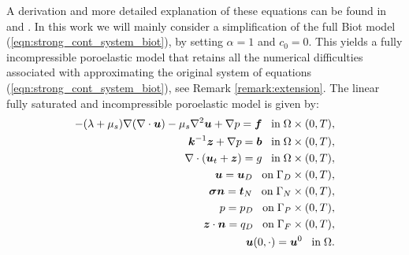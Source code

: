 \begin{table}[H]
\begin{center}
\end{center}
\caption{Poroelasticity parameters.} 
\label{tab:parameters}
\end{table}
\noindent A derivation and more detailed explanation of these equations can be found in \citet{phillips2007coupling} and \citet{showalter2000diffusion}. In this work we will mainly consider a simplification of the full Biot model (\ref{eqn:strong_cont_system_biot}), by setting $\alpha=1$ and $c_{0}=0$. This yields a fully incompressible poroelastic model that retains all the numerical difficulties associated with approximating the original system of equations (\ref{eqn:strong_cont_system_biot}), see Remark \ref{remark:extension}. The linear fully saturated and incompressible poroelastic model is given by: 
\begin{subequations}
\begin{align}
\label{eqn:strong_mixture_momentum_simple}
-(\lambda+\mu_{s}) \nabla (\nabla\cdot\boldsymbol{u})-\mu_{s} \nabla^{2} \boldsymbol{u} + \nabla p = \boldsymbol{f} \;\;\; \mbox{in}\; \Omega\times (0,T),\\
{\boldsymbol{k}^{-1}\boldsymbol{z}} + \nabla p =  \boldsymbol{b} \;\;\; \mbox{in}\; \Omega\times (0,T),\\
\nabla \cdot (\boldsymbol{u}_{t} + \boldsymbol{z} )  = g   \;\;\; \mbox{in}\; \Omega\times (0,T),
\\
\boldsymbol{u} =\boldsymbol{u}_{D}   \;\;\; \mbox{on}\; \Gamma_{D}\times (0,T),
\\
\boldsymbol{\sigma}\boldsymbol{n} = \boldsymbol{t}_{N}   \;\;\; \mbox{on}\; \Gamma_{N}\times (0,T),
\\
p = p_{D}   \;\;\; \mbox{on}\; \Gamma_{P}\times (0,T),
\\
\boldsymbol{z} \cdot \boldsymbol{n} = {q_{D}}   \;\;\; \mbox{on}\; \Gamma_{F}\times (0,T),
\\
\boldsymbol{u}(0,\cdot) = \boldsymbol{u}^{0}  \;\;\;  \mbox{in}\;\Omega.
\end{align}
\label{eqn:linear_simple_system}
\end{subequations}

